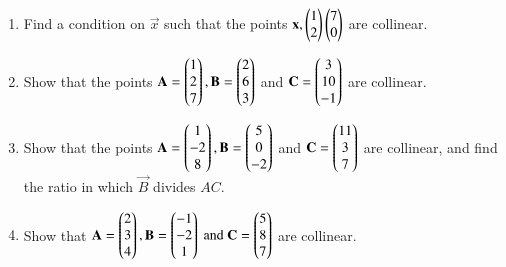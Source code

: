 \begin{enumerate}[label=\arabic*.,ref=\thesubsection.\theenumi]
\begin{enumerate}
\item {},  ,   
\item {},  ,   
\end{enumerate}
\item Find a condition on $\vec{x}$  such that the points $\mathbf{x}, \begin{pmatrix}1\\2\end{pmatrix}\begin{pmatrix}7\\0\end{pmatrix}$ are collinear.
\item Show that the points 
$\mathbf{A}=\begin{pmatrix}1\\2\\7\end{pmatrix}, \mathbf{B}=\begin{pmatrix}2\\6\\3\end{pmatrix}$ and $ \mathbf{C}=\begin{pmatrix}3\\10\\-1\end{pmatrix}$ are collinear.
\item Show that the points 
$\mathbf{A}=\begin{pmatrix}1\\-2\\8\end{pmatrix}, \mathbf{B}=\begin{pmatrix}5\\0\\-2\end{pmatrix}$ and $ \mathbf{C}=\begin{pmatrix}11\\3\\7\end{pmatrix}$ are collinear, and find the ratio in which $\vec{B}$ divides $AC$.
\item Show that 
$
\mathbf{A}=\begin{pmatrix}2\\3\\4\end{pmatrix}, 
\mathbf{B}=\begin{pmatrix}-1\\-2\\1\end{pmatrix} \text{ and } 
\mathbf{C}=\begin{pmatrix}5\\8\\7\end{pmatrix}$  
are collinear.
\end{enumerate}
%
